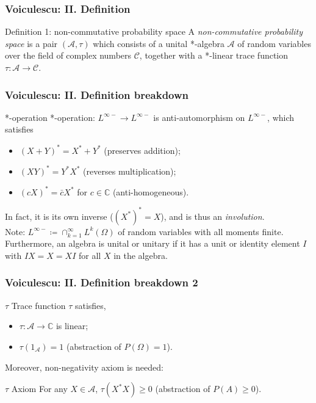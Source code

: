 \documentclass{beamer}
\begin{document}
\begin{frame}
\frametitle{Voiculescu: II. Definition}
\begin{block}{Definition 1: non-commutative probability space}
A \textit{non-commutative probability space} is a pair $(\mathcal{A}, \tau)$ which consists of a unital *-algebra $\mathcal{A}$ of random variables over the field of complex numbers $\mathcal{C}$, together with a *-linear trace function $\tau: \mathcal{A} \rightarrow \mathcal{C}$. 
\end{block}
\end{frame}

\begin{frame}
\frametitle{Voiculescu: II. Definition breakdown}
\begin{block}{*-operation}
*-operation: $L^{\infty-} \rightarrow L^{\infty-} $ is anti-automorphism on $L^{\infty-}$, which satisfies
\begin{itemize}
\item $(X+Y)^* = X^*+Y^*$ (preserves addition);
\item $(XY)^*=Y^*X^*$ (reverses multiplication);
\item $(cX)^* = \bar{c}X^*$ for $c\in \mathbb{C}$ (anti-homogeneous).
\end{itemize}
In fact, it is its own inverse ($(X^*)^* = X$), and is thus an \textit{involution}.\\
Note: $L^{\infty-}\coloneqq \cap_{k=1}^{\infty} L^k(\Omega)$ of random variables with all moments finite.\\
Furthermore, an algebra is unital or unitary if it has a unit or identity element $I$ with $IX = X = XI$ for all $X$ in the algebra.
\end{block}
\end{frame}

\begin{frame}
\frametitle{Voiculescu: II. Definition breakdown 2}
\begin{block}{$\tau$}
Trace function $\tau$ satisfies,
\begin{itemize}
\item $\tau: \mathcal{A} \rightarrow \mathbb{C}$ is linear;
\item $\tau(1_{\mathcal{A}})=1$ (abstraction of $P(\Omega)=1$).
\end{itemize}
\end{block}
Moreover, non-negativity axiom is needed:
\begin{block}{$\tau$ Axiom}
For any $X\in \mathcal{A}$, $\tau(X^*X) \geq 0$ (abstraction of $P(A)\geq 0$).
\end{block}
\end{frame}
\end{document}
